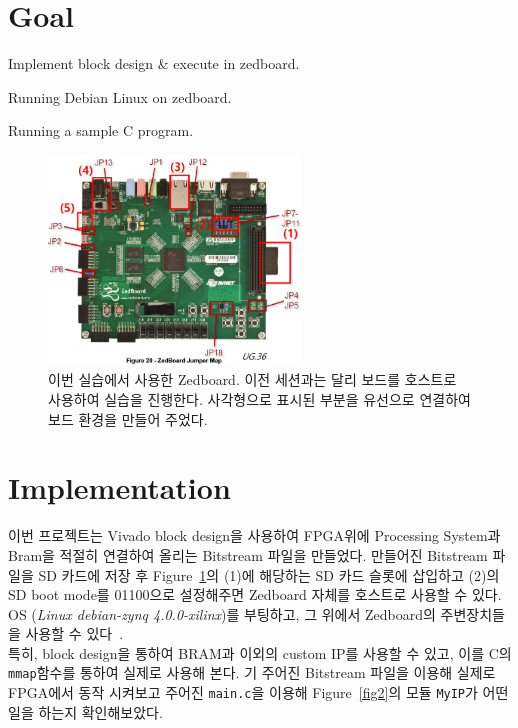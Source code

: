 \documentclass{article}
\begin{document}
\pagestyle{fancy}

\section*{Goal}

\begin{itemize*}
\item Implement block design \& execute in zedboard.
\begin{itemize*}
\item Running Debian Linux on zedboard.
\item Running a sample C program.
\end{itemize*}
\end{itemize*}
\begin{figure}[ht]
	\centering
	\includegraphics[width=0.6\textwidth]{fig/zedboard.PNG}
\caption{이번 실습에서 사용한 Zedboard. 이전 세션과는 달리 보드를 호스트로 사용하여 실습을 진행한다. 사각형으로 표시된 부분을 유선으로 연결하여 보드 환경을 만들어 주었다. }
\label{fig1}
\end{figure}

\section{Implementation}
이번 프로젝트는 Vivado block design을 사용하여 FPGA위에 Processing System과 Bram을 적절히 연결하여 올리는 Bitstream 파일을 만들었다.
만들어진 Bitstream 파일을 SD 카드에 저장 후 Figure~\ref{fig1}의 (1)에 해당하는 SD 카드 슬롯에 삽입하고 (2)의 SD boot mode를 01100으로 설정해주면 Zedboard 자체를 호스트로 사용할 수 있다. OS (\textit{Linux debian-zynq 4.0.0-xilinx})를 부팅하고, 그 위에서 Zedboard의 주변장치들을 사용할 수 있다~\cite{lab}.\\

특히, block design을 통하여 BRAM과 이외의 custom IP를 사용할 수 있고, 이를 C의 \texttt{mmap}함수를 통하여 실제로 사용해 본다. 
기 주어진 Bitstream 파일을 이용해 실제로 FPGA에서 동작 시켜보고 주어진 \texttt{main.c}을 이용해 Figure~\ref{fig2}의 모듈 \texttt{MyIP}가 어떤 일을 하는지 확인해보았다.
\end{document}
